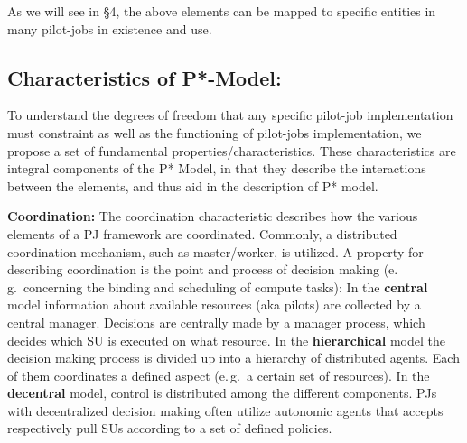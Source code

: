 \documentclass[conference,final]{IEEEtran}
\newcommand{\upp}{\vspace*{-0.5em}}
\begin{document}
	
As we will see in \S4, the above elements can be mapped to specific
entities in many pilot-jobs in existence and use.

 

% 
% 


\subsection{Characteristics of P*-Model:\upp\upp}
\label{sec:p_star_elements}

To understand the degrees of freedom that any specific pilot-job
implementation must constraint as well as the functioning of
pilot-jobs implementation, we propose a set of fundamental
properties/characteristics. These characteristics are integral
components of the P* Model, in that they describe the interactions
between the elements, and thus aid in the description of P*
model. 


\textbf{Coordination:} The coordination characteristic describes how the various 
elements of a PJ framework are coordinated. 
Commonly, a distributed coordination mechanism, such as master/worker, is 
utilized. A property for
describing coordination is the point and process of decision making
(e.\,g.\ concerning the binding and scheduling of compute tasks): In
the \textbf{central} model information about available resources (aka
pilots) are collected by a central manager. Decisions are centrally
made by a manager process, which decides which SU is executed on what
resource. In the \textbf{hierarchical} model the decision making
process is divided up into a hierarchy of distributed agents. Each of
them coordinates a defined aspect (e.\,g.\ a certain set of
resources). In the \textbf{decentral} model, control is distributed
among the different components.  PJs with decentralized decision
making often utilize autonomic agents that accepts respectively pull
SUs according to a set of defined policies.
\end{document}
